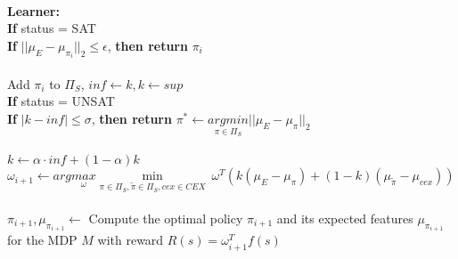 \begin{algorithm}[htpb]
\begin{algorithmic}[1]
\\\qquad\textbf{Learner:}
\\\qquad\qquad \textbf{If} status = SAT
\\\qquad\qquad\qquad \textbf{If} $||\mu_E-\mu_{\pi_i}||_2\leq \epsilon$, {\bf then return} $\pi_i$
\\
\\\qquad\qquad\qquad Add $\pi_i$ to $\Pi_S$, $inf \leftarrow k, k \leftarrow sup$
\\\qquad\qquad \textbf{If} status = UNSAT
\\\qquad\qquad\qquad \textbf{If} $|k - inf|\leq\sigma$, {\bf then return} $\pi^*\leftarrow\underset{{\pi}\in \Pi_S}{argmin}||\mu_E - \mu_{{\pi}}||_2$\\
\\\qquad\qquad\qquad $k \leftarrow \alpha\cdot inf + (1 - \alpha)k$ 
\\\qquad\qquad $\omega_{i+1} \leftarrow arg\underset{\omega}{max}\underset{\pi\in\Pi_S, \tilde{\pi}\in\Pi_S, cex\in CEX}{\min}\ \omega^T(k(\mu_E - \mu_{\pi})+(1-k)(\mu_{\tilde{\pi}}  - \mu_{cex}))$
\\ 
\\\qquad\qquad $\pi_{i+1}, \mu_{\pi_{i+1}}\gets$ Compute the optimal policy $\pi_{i+1}$ and its expected features $\mu_{\pi_{i+1}}$ for the MDP $M$ with reward $R(s)=\omega_{i+1}^T f(s)$
\\
\end{algorithmic}
\label{algo1}
\end{algorithm}


